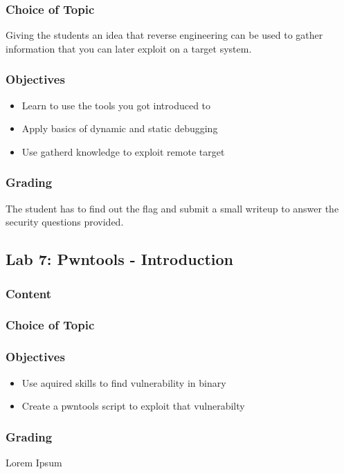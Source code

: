\subsubsection*{Choice of Topic}
Giving the students an idea that reverse engineering can be used to gather information that you can later exploit on a target system.
\subsubsection*{Objectives}
\begin{itemize}
    \item Learn to use the tools you got introduced to
    \item Apply basics of dynamic and static debugging
    \item Use gatherd knowledge to exploit remote target
\end{itemize}
\subsubsection*{Grading}
The student has to find out the flag and submit a small writeup to answer the security questions provided.

\subsection{Lab 7: Pwntools - Introduction}
\subsubsection*{Content}

\subsubsection*{Choice of Topic}

\subsubsection*{Objectives}
\begin{itemize}
    \item Use aquired skills to find vulnerability in binary
    \item Create a pwntools script to exploit that vulnerabilty
\end{itemize}
\subsubsection*{Grading}
Lorem Ipsum
